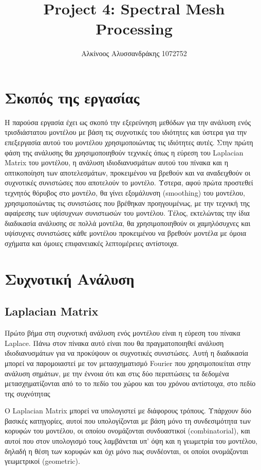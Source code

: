 \documentclass{article}
\title{Project 4: Spectral Mesh Processing}
\author{Αλκίνοος Αλυσσανδράκης 1072752}
\date{}
\begin{document}
\maketitle

\tableofcontents
\newpage

\section{Σκοπός της εργασίας}
Η παρούσα εργασία έχει ως σκοπό την εξερεύνηση μεθόδων για την ανάλυση ενός τρισδιάστατου
μοντέλου με βάση τις συχνοτικές του ιδιότητες και ύστερα για την επεξεργασία αυτού του
μοντέλου χρησιμοποιώντας τις ιδιότητες αυτές. Στην πρώτη φάση της ανάλυσης θα
χρησιμοποιηθούν τεχνικές όπως η εύρεση του Laplacian Matrix του μοντέλου, η ανάλυση
ιδιοδιανυσμάτων αυτού του πίνακα και η οπτικοποίηση των αποτελεσμάτων, προκειμένου να
βρεθούν και να αναδειχθούν οι συχνοτικές συνιστώσες που αποτελούν το μοντέλο. Ύστερα,
αφού πρώτα προστεθεί τεχνητός θόρυβος στο μοντέλο, θα γίνει εξομάλυνση (smoothing) του
μοντέλου, χρησιμοποιώντας τις συνιστώσες που βρέθηκαν προηγουμένως, με την τεχνική της
αφαίρεσης των υψίσυχνων συνιστωσών του μοντέλου. Τέλος, εκτελώντας την ίδια διαδικασία
ανάλυσης σε πολλά μοντέλα, θα χρησιμοποιηθούν οι χαμηλόσυχνες και υψίσυχνες συνιστώσες
κάθε μοντέλου προκειμένου να βρεθούν μοντέλα με όμοια σχήματα και όμοιες επιφανειακές
λεπτομέρειες αντίστοιχα.

\section{Συχνοτική Ανάλυση}

\subsection{Laplacian Matrix}
Πρώτο βήμα στη συχνοτική ανάλυση ενός μοντέλου είναι η εύρεση του πίνακα Laplace. Πάνω
στον πίνακα αυτό είναι που θα πραγματοποιηθεί ανάλυση ιδιοδιανυσμάτων για να προκύψουν οι
συχνοτικές συνιστώσες. Αυτή η διαδικασία μπορεί να παρομοιαστεί με τον μετασχηματισμό
Fourier που χρησιμοποιείται στην ανάλυση σημάτων, με την έννοια ότι και στις δύο
περιπτώσεις τα δεδομένα μετασχηματίζονται από το το πεδίο του χώρου και του χρόνου
αντίστοιχα, στο πεδίο της συχνότητας

Ο Laplacian Matrix μπορεί να υπολογιστεί με διάφορους τρόπους.
Υπάρχουν δύο βασικές κατηγορίες,
αυτοί που υπολογίζονται με βάση μόνο τη συνδεσιμότητα των κορυφών του μοντέλου,
οι οποίου ονομάζονται συνδυαστικοί (combinatorial),
και αυτοί που στον υπολογισμό τους λαμβάνεται υπ' όψη και η γεωμετρία του μοντέλου,
δηλαδή η θέση των κορυφών και όχι μόνο πως συνδέονται,
οι οποίοι ονομάζονται γεωμετρικοί (geometric).
\end{document}
